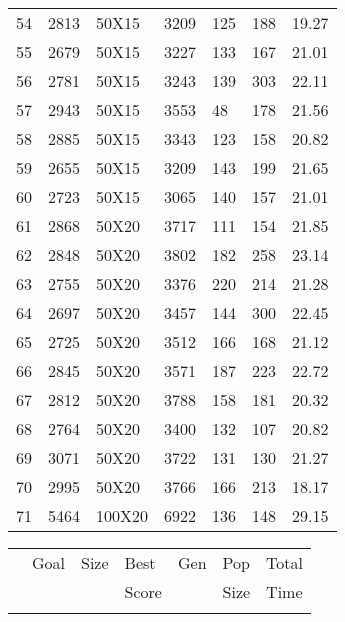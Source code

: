 \documentclass[14pt]{acmsiggraph}
\begin{document}
\begin{table}[h!]
\begin{center}
{\begin{tabular}{lllllll||}
					54  & 2813 & 50X15  & \cellcolor[rgb]{0.59,0.74,0.34}3209 & 125 & 188  & 19.27 \\
					55  & 2679 & 50X15  & \cellcolor[rgb]{0.66,0.77,0.37}3227 & 133 & 167  & 21.01 \\
					56  & 2781 & 50X15  & \cellcolor[rgb]{0.62,0.75,0.35}3243 & 139 & 303  & 22.11 \\
					57  & 2943 & 50X15  & \cellcolor[rgb]{0.67,0.77,0.37}3553 & 48  & 178  & 21.56 \\
					58  & 2885 & 50X15  & \cellcolor[rgb]{0.61,0.75,0.35}3343 & 123 & 158  & 20.82 \\
					59  & 2655 & 50X15  & \cellcolor[rgb]{0.67,0.77,0.37}3209 & 143 & 199  & 21.65 \\
					60  & 2723 & 50X15  & \cellcolor[rgb]{0.57,0.73,0.33}3065 & 140 & 157  & 21.01 \\
					61  & 2868 & 50X20  & \cellcolor[rgb]{0.76,0.81,0.41}3717 & 111 & 154  & 21.85 \\
					62  & 2848 & 50X20  & \cellcolor[rgb]{0.81,0.83,0.43}3802 & 182 & 258  & 23.14 \\
					63  & 2755 & 50X20  & \cellcolor[rgb]{0.69,0.78,0.38}3376 & 220 & 214  & 21.28 \\
					64  & 2697 & 50X20  & \cellcolor[rgb]{0.75,0.81,0.41}3457 & 144 & 300  & 22.45 \\
					65  & 2725 & 50X20  & \cellcolor[rgb]{0.76,0.81,0.41}3512 & 166 & 168  & 21.12 \\
					66  & 2845 & 50X20  & \cellcolor[rgb]{0.72,0.8,0.4}3571   & 187 & 223  & 22.72 \\
					67  & 2812 & 50X20  & \cellcolor[rgb]{0.82,0.84,0.44}3788 & 158 & 181  & 20.32 \\
					68  & 2764 & 50X20  & \cellcolor[rgb]{0.69,0.78,0.38}3400 & 132 & 107  & 20.82 \\
					69  & 3071 & 50X20  & \cellcolor[rgb]{0.67,0.78,0.37}3722 & 131 & 130  & 21.27 \\
					70  & 2995 & 50X20  & \cellcolor[rgb]{0.72,0.8,0.4}3766   & 166 & 213  & 18.17 \\
					71  & 5464 & 100X20 & \cellcolor[rgb]{0.73,0.8,0.4}6922   & 136 & 148  & 29.15 \\
				\end{tabular}\centering
			}
			\subtable
			{
				\begin{tabular}{||lllllll}
					 & Goal   & Size   & Best & Gen & Pop & Total \\ 
					 &  &    & Score &   &  Size & Time \\ \hline \\

\end{tabular}}
\end{center}
\end{table}
\end{document}
